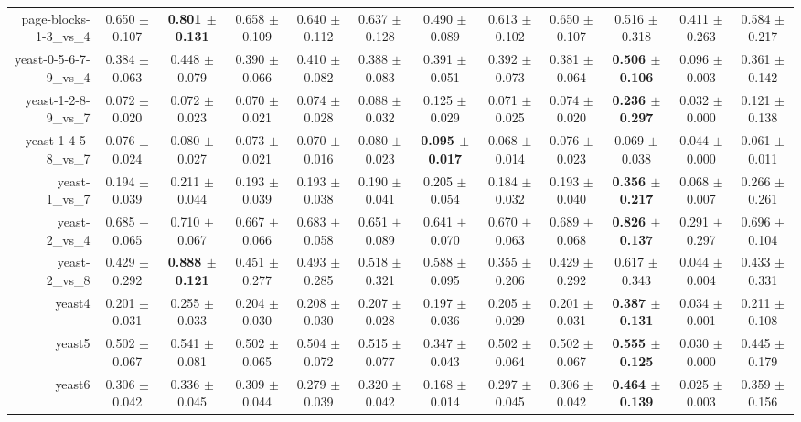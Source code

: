 \begin{table}[!ht]
{\begin{tabular}{r c c c c c c c c c c c}
page-blocks-1-3\_vs\_4 & 0.650 $\pm$ 0.107 & \textbf{0.801 $\pm$ 0.131} & 0.658 $\pm$ 0.109 & 0.640 $\pm$ 0.112 & 0.637 $\pm$ 0.128 & 0.490 $\pm$ 0.089 & 0.613 $\pm$ 0.102 & 0.650 $\pm$ 0.107 & 0.516 $\pm$ 0.318 & 0.411 $\pm$ 0.263 & 0.584 $\pm$ 0.217 \\
yeast-0-5-6-7-9\_vs\_4 & 0.384 $\pm$ 0.063 & 0.448 $\pm$ 0.079 & 0.390 $\pm$ 0.066 & 0.410 $\pm$ 0.082 & 0.388 $\pm$ 0.083 & 0.391 $\pm$ 0.051 & 0.392 $\pm$ 0.073 & 0.381 $\pm$ 0.064 & \textbf{0.506 $\pm$ 0.106} & 0.096 $\pm$ 0.003 & 0.361 $\pm$ 0.142 \\
yeast-1-2-8-9\_vs\_7 & 0.072 $\pm$ 0.020 & 0.072 $\pm$ 0.023 & 0.070 $\pm$ 0.021 & 0.074 $\pm$ 0.028 & 0.088 $\pm$ 0.032 & 0.125 $\pm$ 0.029 & 0.071 $\pm$ 0.025 & 0.074 $\pm$ 0.020 & \textbf{0.236 $\pm$ 0.297} & 0.032 $\pm$ 0.000 & 0.121 $\pm$ 0.138 \\
yeast-1-4-5-8\_vs\_7 & 0.076 $\pm$ 0.024 & 0.080 $\pm$ 0.027 & 0.073 $\pm$ 0.021 & 0.070 $\pm$ 0.016 & 0.080 $\pm$ 0.023 & \textbf{0.095 $\pm$ 0.017} & 0.068 $\pm$ 0.014 & 0.076 $\pm$ 0.023 & 0.069 $\pm$ 0.038 & 0.044 $\pm$ 0.000 & 0.061 $\pm$ 0.011 \\
yeast-1\_vs\_7 & 0.194 $\pm$ 0.039 & 0.211 $\pm$ 0.044 & 0.193 $\pm$ 0.039 & 0.193 $\pm$ 0.038 & 0.190 $\pm$ 0.041 & 0.205 $\pm$ 0.054 & 0.184 $\pm$ 0.032 & 0.193 $\pm$ 0.040 & \textbf{0.356 $\pm$ 0.217} & 0.068 $\pm$ 0.007 & 0.266 $\pm$ 0.261 \\
yeast-2\_vs\_4 & 0.685 $\pm$ 0.065 & 0.710 $\pm$ 0.067 & 0.667 $\pm$ 0.066 & 0.683 $\pm$ 0.058 & 0.651 $\pm$ 0.089 & 0.641 $\pm$ 0.070 & 0.670 $\pm$ 0.063 & 0.689 $\pm$ 0.068 & \textbf{0.826 $\pm$ 0.137} & 0.291 $\pm$ 0.297 & 0.696 $\pm$ 0.104 \\
yeast-2\_vs\_8 & 0.429 $\pm$ 0.292 & \textbf{0.888 $\pm$ 0.121} & 0.451 $\pm$ 0.277 & 0.493 $\pm$ 0.285 & 0.518 $\pm$ 0.321 & 0.588 $\pm$ 0.095 & 0.355 $\pm$ 0.206 & 0.429 $\pm$ 0.292 & 0.617 $\pm$ 0.343 & 0.044 $\pm$ 0.004 & 0.433 $\pm$ 0.331 \\
yeast4 & 0.201 $\pm$ 0.031 & 0.255 $\pm$ 0.033 & 0.204 $\pm$ 0.030 & 0.208 $\pm$ 0.030 & 0.207 $\pm$ 0.028 & 0.197 $\pm$ 0.036 & 0.205 $\pm$ 0.029 & 0.201 $\pm$ 0.031 & \textbf{0.387 $\pm$ 0.131} & 0.034 $\pm$ 0.001 & 0.211 $\pm$ 0.108 \\
yeast5 & 0.502 $\pm$ 0.067 & 0.541 $\pm$ 0.081 & 0.502 $\pm$ 0.065 & 0.504 $\pm$ 0.072 & 0.515 $\pm$ 0.077 & 0.347 $\pm$ 0.043 & 0.502 $\pm$ 0.064 & 0.502 $\pm$ 0.067 & \textbf{0.555 $\pm$ 0.125} & 0.030 $\pm$ 0.000 & 0.445 $\pm$ 0.179 \\
yeast6 & 0.306 $\pm$ 0.042 & 0.336 $\pm$ 0.045 & 0.309 $\pm$ 0.044 & 0.279 $\pm$ 0.039 & 0.320 $\pm$ 0.042 & 0.168 $\pm$ 0.014 & 0.297 $\pm$ 0.045 & 0.306 $\pm$ 0.042 & \textbf{0.464 $\pm$ 0.139} & 0.025 $\pm$ 0.003 & 0.359 $\pm$ 0.156 \\

\end{tabular}}
\end{table}
